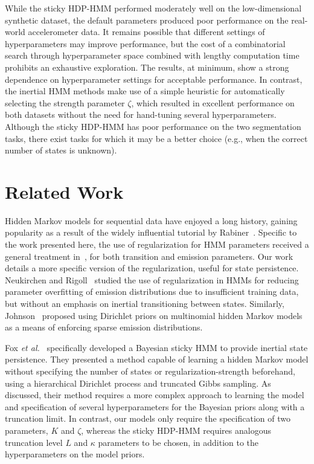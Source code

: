 \documentclass[letterpaper]{article}
\begin{document}
While the sticky HDP-HMM performed moderately well on the low-dimensional
synthetic dataset, the default parameters produced poor performance on the
real-world accelerometer data. It remains possible that different settings of
hyperparameters may improve performance, but the cost of a combinatorial search
through hyperparameter space combined with lengthy computation time prohibits an exhaustive 
exploration. The results, at minimum, show a strong dependence on hyperparameter settings for 
acceptable performance. In contrast, the inertial HMM methods make use of a simple heuristic for 
automatically selecting the strength parameter $\zeta$, which resulted in excellent performance on 
both datasets without the need for hand-tuning several hyperparameters. Although the sticky HDP-HMM 
has poor performance on the two segmentation tasks, there exist tasks for which it may be a better 
choice (e.g., when the correct number of states is unknown).

\section{Related Work}

Hidden Markov models for sequential data have enjoyed a long history, gaining
popularity as a result of the widely influential tutorial by
Rabiner~\cite{rabiner1989tutorial}. Specific to the work presented here, the use
of regularization for HMM parameters received a general treatment
in~\cite{MAP1994}, for both transition and emission parameters. Our work details
a more specific version of the regularization, useful for state persistence.
Neukirchen and Rigoll~\cite{neukirchen1999controlling} studied the use of
regularization in HMMs for reducing parameter overfitting of emission
distributions due to insufficient training data, but without an emphasis on
inertial transitioning between states. Similarly,
Johnson~\cite{Johnson07whydoesnt} proposed using Dirichlet priors on multinomial
hidden Markov models as a means of enforcing sparse emission distributions.

Fox \emph{et al.}\ \cite{fox2011sticky} specifically developed a Bayesian sticky
HMM to provide inertial state persistence. They presented a method capable of
learning a hidden Markov model without specifying the number of states or
regularization-strength beforehand, using a hierarchical Dirichlet process and
truncated Gibbs sampling. As discussed, their method requires a more complex approach to
learning the model and specification of several hyperparameters for the Bayesian priors 
along with a truncation limit. In contrast, our models only require the 
specification of two parameters, $K$ and $\zeta$, whereas the
sticky HDP-HMM requires analogous truncation level $L$ and $\kappa$ parameters
to be chosen, in addition to the hyperparameters on the model priors. 
\end{document}
